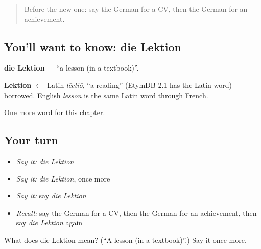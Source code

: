 \label{lesson:GE-C233-lektion}



\begin{quote}
Before the new one: say the German for a CV, then the German for an achievement.
\end{quote}

\subsection*{You'll want to know: die Lektion}
\textbf{die Lektion} — \textquotedblleft{}a lesson (in a textbook)\textquotedblright{}.

\begin{cousinweb}
\textbf{Lektion} $\leftarrow$ Latin \emph{lēctiō}, \textquotedblleft{}a reading\textquotedblright{} (EtymDB 2.1 has the Latin word) — borrowed. English \emph{lesson} is the same Latin word through French.
\end{cousinweb}

\begin{grammarlens}[title={What you've built}]
One more word for this chapter.
\end{grammarlens}

\subsection*{Your turn}
\begin{itemize}
\raggedright
  \item \emph{Say it:} \emph{die Lektion}
  \item \emph{Say it:} \emph{die Lektion}, once more
  \item \emph{Say it:} say \emph{die Lektion}
  \item \emph{Recall:} say the German for a CV, then the German for an achievement, then say \emph{die Lektion} again
\end{itemize}

\begin{tcolorbox}[breakable,colback=teal!4,colframe=teal!35!black,title={Before you move on}]
What does die Lektion mean? (\textquotedblleft{}A lesson (in a textbook)\textquotedblright{}.) Say it once more.
\end{tcolorbox}
